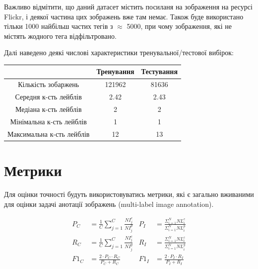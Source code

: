 \documentclass{udstu}
\begin{document}
Важливо відмітити, що даний датасет містить посиланя на зображення на ресурсі Flickr, і деякої частина цих
зображень вже там немає. Також буде використано тільки 1000 найбільш частих тегів з $\approx$ 5000,
при чому зображення, які не містять жодного тега відфільтровано.

Далі наведено деякі числові характеристики тренувальної/тестової вибірок:

\begin{center}
\begin{tabular}{ccc}
		\toprule[2pt]
           & Тренування & Тестування \\
        \midrule
        Кількість зобаржень & 121962  & 81636 \\
        Середня к-сть лейблів & 2.42  & 2.43 \\
        Медіана к-сть лейблів & 2  & 2 \\
        Мінімальна к-сть лейблів & 1  & 1 \\
        Максимальна к-сть лейблів & 12  & 13 \\
        \bottomrule[2pt]
\end{tabular}
\end{center}

\clearpage


\section{Метрики}

Для оцінки точності будуть використовуватись метрики, які є загально вживаними для оцінки
задачі анотації зображень (multi-label image annotation).

\begin{equation}
\begin{aligned}
P_C &= \frac{1}{C} \sum_{j=1}^C \frac{NI^c_j}{NI^p_j} & P_I &= \frac{\Sigma^N_{i=1} NL^c_i}{\Sigma^N_{i=1} NL^p_i} \\
R_C &= \frac{1}{C} \sum_{j=1}^C \frac{NI^c_j}{NI^g_j} & R_I &= \frac{\Sigma^N_{i=1} NL^c_i}{\Sigma^N_{i=1} NL^g_i} \\
F1_C &= \frac{2 \cdot P_C \cdot R_C}{P_C + R_C} & F1_I &= \frac{2 \cdot P_I \cdot R_I}{P_I + R_I} \\
\end{aligned}
\end{equation}
\end{document}
